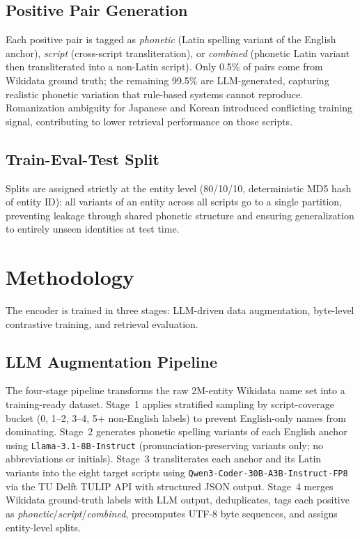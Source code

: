 \documentclass[sigconf]{acmart}
\begin{document}
\subsection{Positive Pair Generation}
Each positive pair is tagged as \textit{phonetic} (Latin spelling variant of the English anchor), \textit{script} (cross-script transliteration), or \textit{combined} (phonetic Latin variant then transliterated into a non-Latin script). Only 0.5\% of pairs come from Wikidata ground truth; the remaining 99.5\% are LLM-generated, capturing realistic phonetic variation that rule-based systems cannot reproduce. Romanization ambiguity for Japanese and Korean introduced conflicting training signal, contributing to lower retrieval performance on those scripts.

\subsection{Train-Eval-Test Split}
Splits are assigned strictly at the entity level (80/10/10, deterministic MD5 hash of entity ID): all variants of an entity across all scripts go to a single partition, preventing leakage through shared phonetic structure and ensuring generalization to entirely unseen identities at test time.

\section{Methodology}
\label{sec:method}
The encoder is trained in three stages: LLM-driven data augmentation, byte-level contrastive training, and retrieval evaluation.

\subsection{LLM Augmentation Pipeline}
The four-stage pipeline transforms the raw 2M-entity Wikidata name set into a training-ready dataset. Stage~1 applies stratified sampling by script-coverage bucket (0, 1--2, 3--4, 5+ non-English labels) to prevent English-only names from dominating. Stage~2 generates phonetic spelling variants of each English anchor using \texttt{Llama-3.1-8B-Instruct} (pronunciation-preserving variants only; no abbreviations or initials). Stage~3 transliterates each anchor and its Latin variants into the eight target scripts using \texttt{Qwen3-Coder-30B-A3B-Instruct-FP8} via the TU Delft TULIP API with structured JSON output. Stage~4 merges Wikidata ground-truth labels with LLM output, deduplicates, tags each positive as \textit{phonetic}/\textit{script}/\textit{combined}, precomputes UTF-8 byte sequences, and assigns entity-level splits.
\end{document}
